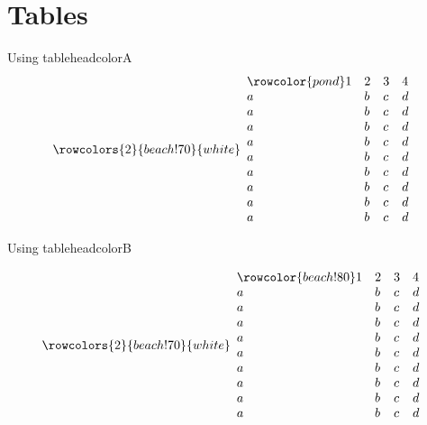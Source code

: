 \documentclass{my_thesis}
\def\tableheadcolorA{pond}
\def\tableheadcolorB{beach!80}
\def\shade{beach!70} %
\begin{document}
\section{Tables}
Using tableheadcolorA
\[
    \rowcolors{2}{\shade}{white} %
    \begin{array}{llll}
    \rowcolor{\tableheadcolorA} %
        1 & 2 & 3 & 4\\
        a & b & c & d\\
        a & b & c & d\\
        a & b & c & d\\
        a & b & c & d\\
        a & b & c & d\\
        a & b & c & d\\
        a & b & c & d\\
        a & b & c & d\\
        a & b & c & d
    \end{array}
\]

Using tableheadcolorB

\[
    \rowcolors{2}{\shade}{white} %
    \begin{array}{llll}
    \rowcolor{\tableheadcolorB} %
        1 & 2 & 3 & 4\\
        a & b & c & d\\
        a & b & c & d\\
        a & b & c & d\\
        a & b & c & d\\
        a & b & c & d\\
        a & b & c & d\\
        a & b & c & d\\
        a & b & c & d\\
        a & b & c & d
    \end{array}
\]
\end{document}
